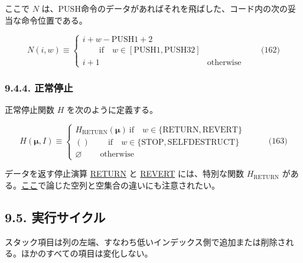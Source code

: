 \documentclass[
]{ltjsarticle}
\begin{document}
ここで \(N\)
は、PUSH命令のデータがあればそれを飛ばした、コード内の次の妥当な命令位置である。

\protect\hypertarget{eq-162}{}{}

\[N(i, w) \equiv \begin{cases}
i + w - \text{PUSH1} + 2 & \\
\quad\quad\text{if} \quad w \in [\text{PUSH1}, \text{PUSH32}] \\
i + 1 & \text{otherwise} \end{cases} \qquad \text{(162)}\]

\protect\hypertarget{hhalt}{}{}

\hypertarget{ux6b63ux5e38ux505cux6b62}{%
\subsubsection{9.4.4. 正常停止}\label{ux6b63ux5e38ux505cux6b62}}

\hypertarget{normal_halting_function_H}{}

正常停止関数 \(H\) を次のように定義する。

\protect\hypertarget{eq-163}{}{}

\[H(\boldsymbol{\mu}, I) \equiv \begin{cases}
H_{\text{RETURN}}(\boldsymbol{\mu}) \ \text{if} \quad w \in \{\text{RETURN}, \text{REVERT}\} &\\
() \quad\quad\ \text{if} \quad w \in \{ \text{STOP}, \text{SELFDESTRUCT} \} &\\
\varnothing \quad\quad\ \text{otherwise}&
\end{cases} \qquad \text{(163)}\]

データを返す停止演算 \protect\hyperlink{RETURN}{RETURN} と
\protect\hyperlink{REVERT}{REVERT} には、特別な関数
\(H_{\text{RETURN}}\)
がある。\protect\hyperlink{empty_sequence_vs_empty_set}{ここ}で論じた空列と空集合の違いにも注意されたい。

\hypertarget{ux5b9fux884cux30b5ux30a4ux30afux30eb}{%
\subsection{9.5.
実行サイクル}\label{ux5b9fux884cux30b5ux30a4ux30afux30eb}}

スタック項目は列の左端、すなわち低いインデックス側で追加または削除される。ほかのすべての項目は変化しない。

\protect\hypertarget{eq-164}{}{}\protect\hypertarget{eq-165}{}{}\protect\hypertarget{eq-166}{}{}\protect\hypertarget{eq-167}{}{}
\end{document}
